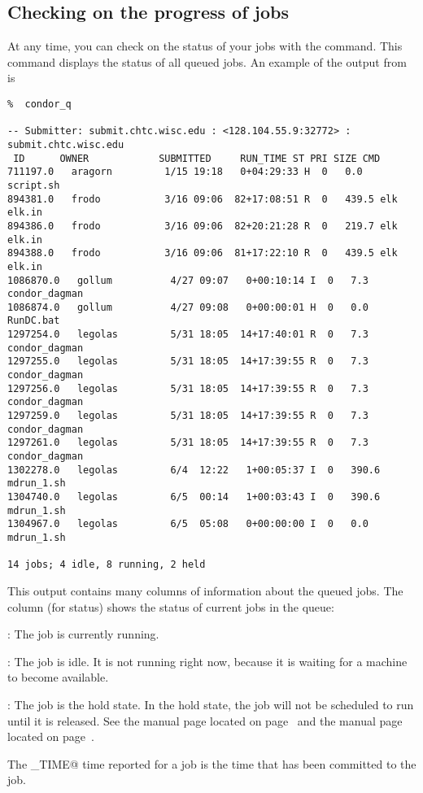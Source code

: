 \subsection{Checking on the progress of jobs}
At any time, you can check on the status of your jobs with the 
command.
This command displays the status of all queued jobs.
An example of the output from  is
\footnotesize
\begin{verbatim}
%  condor_q

-- Submitter: submit.chtc.wisc.edu : <128.104.55.9:32772> : submit.chtc.wisc.edu
 ID      OWNER            SUBMITTED     RUN_TIME ST PRI SIZE CMD               
711197.0   aragorn         1/15 19:18   0+04:29:33 H  0   0.0  script.sh         
894381.0   frodo           3/16 09:06  82+17:08:51 R  0   439.5 elk elk.in        
894386.0   frodo           3/16 09:06  82+20:21:28 R  0   219.7 elk elk.in        
894388.0   frodo           3/16 09:06  81+17:22:10 R  0   439.5 elk elk.in        
1086870.0   gollum          4/27 09:07   0+00:10:14 I  0   7.3  condor_dagman     
1086874.0   gollum          4/27 09:08   0+00:00:01 H  0   0.0  RunDC.bat         
1297254.0   legolas         5/31 18:05  14+17:40:01 R  0   7.3  condor_dagman     
1297255.0   legolas         5/31 18:05  14+17:39:55 R  0   7.3  condor_dagman     
1297256.0   legolas         5/31 18:05  14+17:39:55 R  0   7.3  condor_dagman     
1297259.0   legolas         5/31 18:05  14+17:39:55 R  0   7.3  condor_dagman     
1297261.0   legolas         5/31 18:05  14+17:39:55 R  0   7.3  condor_dagman     
1302278.0   legolas         6/4  12:22   1+00:05:37 I  0   390.6 mdrun_1.sh        
1304740.0   legolas         6/5  00:14   1+00:03:43 I  0   390.6 mdrun_1.sh        
1304967.0   legolas         6/5  05:08   0+00:00:00 I  0   0.0  mdrun_1.sh        

14 jobs; 4 idle, 8 running, 2 held

\end{verbatim} 
\normalsize
This output contains many columns of information about the
queued jobs.
The \verb@ST@ column (for status) shows the status of
current jobs in the queue:
\begin{description} 
  \item{\verb@R@}:  The job is currently running.
  \item{\verb@I@}:  The job is idle.  It is not running right
now, because it is waiting for a machine to become available.
  \item{\verb@H@}:  The job is the hold state. In the hold state,
the job will not be scheduled to
run until it is released. See the 
manual page located on page~\pageref{man-condor-hold}
and the 
manual page located on page~\pageref{man-condor-release}.
\end{description} 
The \verb@RUN_TIME@ time reported for a job is the time that has been
committed to the job.

